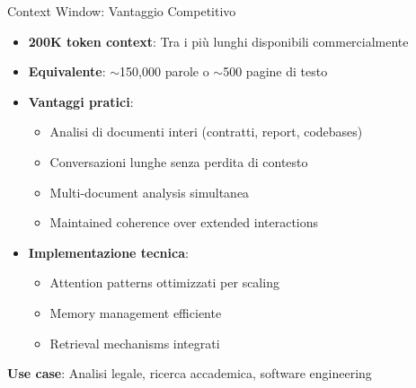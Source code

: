 \documentclass[aspectratio=169]{beamer}
\begin{document}
\begin{frame}{Context Window: Vantaggio Competitivo}
\begin{itemize}
    \item \textbf{200K token context}: Tra i più lunghi disponibili commercialmente
    \item \textbf{Equivalente}: $\sim$150,000 parole o $\sim$500 pagine di testo
    \item \textbf{Vantaggi pratici}:
    \begin{itemize}
        \item Analisi di documenti interi (contratti, report, codebases)
        \item Conversazioni lunghe senza perdita di contesto
        \item Multi-document analysis simultanea
        \item Maintained coherence over extended interactions
    \end{itemize}
    \item \textbf{Implementazione tecnica}:
    \begin{itemize}
        \item Attention patterns ottimizzati per scaling
        \item Memory management efficiente
        \item Retrieval mechanisms integrati
    \end{itemize}
\end{itemize}

\textbf{Use case}: Analisi legale, ricerca accademica, software engineering
\end{frame}
%
%
\end{document}
